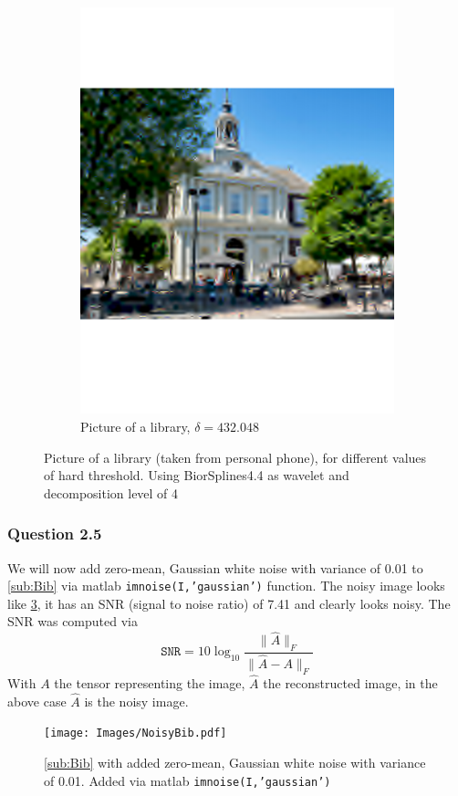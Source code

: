 \documentclass[a4paper]{article}
\begin{document}
\begin{figure}[H]
\begin{subfigure}{0.49\textwidth}
	\includegraphics[trim={4cm 8cm 4cm 8cm},clip,width=1\textwidth]{Images/BibBad.pdf}
	\caption{Picture of a library, $\delta = 432.048$}
	\label{sub:BibBad}
\end{subfigure}
	\caption{Picture of a library (taken from personal phone), for different values of hard threshold. Using BiorSplines4.4 as wavelet and decomposition level of 4}
	\label{fig:Bib}
\end{figure}

    \subsubsection{Question 2.5}

	We will now add zero-mean, Gaussian white noise with variance of 0.01 to \cref{sub:Bib} via matlab \texttt{imnoise(I,'gaussian')} function. The noisy image looks like \cref{fig:Noisy}, it has an SNR (signal to noise ratio) of 7.41 and clearly looks noisy. The SNR was computed via
	\begin{equation}
		\texttt{SNR} = 10 \log_{10}{\frac{\|\hat{A}\|_F}{\|\hat{A}-A\|_F}}
	\end{equation}
	With $A$ the tensor representing the image, $\hat{A}$ the reconstructed image, in the above case $\hat{A}$ is the noisy image.
    \begin{figure}[H]
	\centering
	\texttt{[image: Images/NoisyBib.pdf]}
	\caption{\cref{sub:Bib} with added zero-mean, Gaussian white noise with variance of 0.01. Added via matlab \texttt{imnoise(I,'gaussian')}}
	\label{fig:Noisy}
\end{figure}
\end{document}
